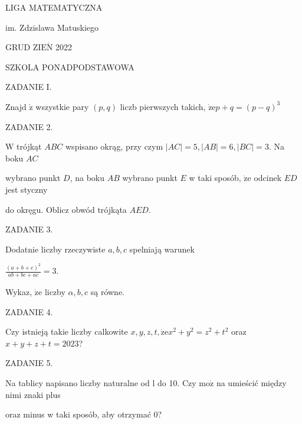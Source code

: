 \documentclass[a4paper,12pt]{article}
\begin{document}
LIGA MATEMATYCZNA

im. Zdzislawa Matuskiego

GRUD Z$\mathrm{I}\mathrm{E}\acute{\mathrm{N}}$ 2022

SZKOLA PONADPODSTAWOWA

ZADANIE I.

Znajd $\acute{\mathrm{z}}$ wszystkie pary $(p,q)$ liczb pierwszych takich, $\dot{\mathrm{z}}\mathrm{e}p+q=(p-q)^{3}$

ZADANIE 2.

$\mathrm{W}$ trójkąt $ABC$ wspisano okrąg, przy czym $|AC| = 5, |AB| = 6, |BC| = 3$. Na boku $AC$

wybrano punkt $D$, na boku $AB$ wybrano punkt $E$ w taki sposób, $\dot{\mathrm{z}}\mathrm{e}$ odcinek $ED$ jest styczny

do okręgu. Oblicz obwód trójkąta $AED.$

ZADANIE 3.

Dodatnie liczby rzeczywiste $a, b, c$ spelniają warunek

$\displaystyle \frac{(a+b+c)^{2}}{ab+bc+ac}=3.$

Wykaz, $\dot{\mathrm{z}}\mathrm{e}$ liczby $\alpha, b, c$ są równe.

ZADANIE 4.

Czy istnieją takie liczby calkowite $x, y, z, t, \dot{\mathrm{z}}\mathrm{e}x^{2}+y^{2}=z^{2}+t^{2}$ oraz $x+y+z+t=2023$?

ZADANIE 5.

Na tablicy napisano liczby naturalne od l do 10. Czy $\mathrm{m}\mathrm{o}\dot{\mathrm{z}}$ na umieścić między nimi znaki plus

oraz minus w taki sposób, aby otrzymać 0?
\end{document}
